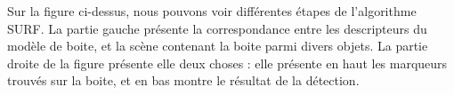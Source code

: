 Sur la figure ci-dessus, nous pouvons voir différentes étapes de l'algorithme SURF. La partie gauche présente la correspondance entre les descripteurs du modèle de boite, et la scène contenant la boite parmi divers objets. La partie droite de la figure présente elle deux choses : elle présente en haut les marqueurs trouvés sur la boite, et en bas montre le résultat de la détection.\\